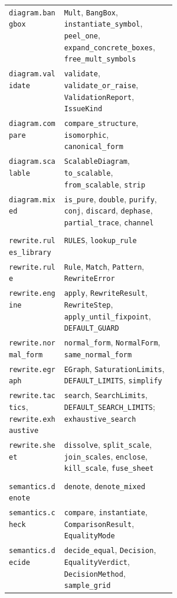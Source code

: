 \begin{xltabular}{\linewidth}{@{}>{\raggedright\arraybackslash}p{0.33\linewidth}X@{}}
\texttt{diagram.bangbox} & \texttt{Mult}, \texttt{BangBox}, \texttt{instantiate\_symbol}, \texttt{peel\_one}, \texttt{expand\_concrete\_boxes}, \texttt{free\_mult\_symbols} \\
\texttt{diagram.validate} & \texttt{validate}, \texttt{validate\_or\_raise}, \texttt{ValidationReport}, \texttt{IssueKind} \\
\texttt{diagram.compare} & \texttt{compare\_structure}, \texttt{isomorphic}, \texttt{canonical\_form} \\
\texttt{diagram.scalable} & \texttt{ScalableDiagram}, \texttt{to\_scalable}, \texttt{from\_scalable}, \texttt{strip} \\
\texttt{diagram.mixed} & \texttt{is\_pure}, \texttt{double}, \texttt{purify}, \texttt{conj}, \texttt{discard}, \texttt{dephase}, \texttt{partial\_trace}, \texttt{channel} \\
 \\
\texttt{rewrite.rules\_library} & \texttt{RULES}, \texttt{lookup\_rule} \\
\texttt{rewrite.rule} & \texttt{Rule}, \texttt{Match}, \texttt{Pattern}, \texttt{RewriteError} \\
\texttt{rewrite.engine} & \texttt{apply}, \texttt{RewriteResult}, \texttt{RewriteStep}, \texttt{apply\_until\_fixpoint}, \texttt{DEFAULT\_GUARD} \\
\texttt{rewrite.normal\_form} & \texttt{normal\_form}, \texttt{NormalForm}, \texttt{same\_normal\_form} \\
\texttt{rewrite.egraph} & \texttt{EGraph}, \texttt{SaturationLimits}, \texttt{DEFAULT\_LIMITS}, \texttt{simplify} \\
\texttt{rewrite.tactics}, \texttt{rewrite.exhaustive} & \texttt{search}, \texttt{SearchLimits}, \texttt{DEFAULT\_SEARCH\_LIMITS}; \texttt{exhaustive\_search} \\
\texttt{rewrite.sheet} & \texttt{dissolve}, \texttt{split\_scale}, \texttt{join\_scales}, \texttt{enclose}, \texttt{kill\_scale}, \texttt{fuse\_sheet} \\
 \\
\texttt{semantics.denote} & \texttt{denote}, \texttt{denote\_mixed} \\
\texttt{semantics.check} & \texttt{compare}, \texttt{instantiate}, \texttt{ComparisonResult}, \texttt{EqualityMode} \\
\texttt{semantics.decide} & \texttt{decide\_equal}, \texttt{Decision}, \texttt{EqualityVerdict}, \texttt{DecisionMethod}, \texttt{sample\_grid} \\

\end{xltabular}
